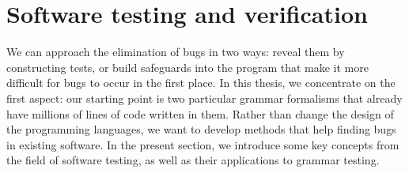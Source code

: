 \section{Software testing and verification}
\label{sec:testing-intro}

%

We can approach the elimination of bugs in two ways: reveal them
by constructing tests, or build safeguards into the program that
make it more difficult for bugs to occur in the first place.
In this thesis, we concentrate on the first aspect: our starting point is two particular grammar
formalisms that already have millions of lines of code written in them.
Rather than change the design of the programming languages, we want to develop methods that help finding bugs in existing software.
In the present section, we introduce some key concepts from
the field of software testing, as well as their applications to grammar
testing.







